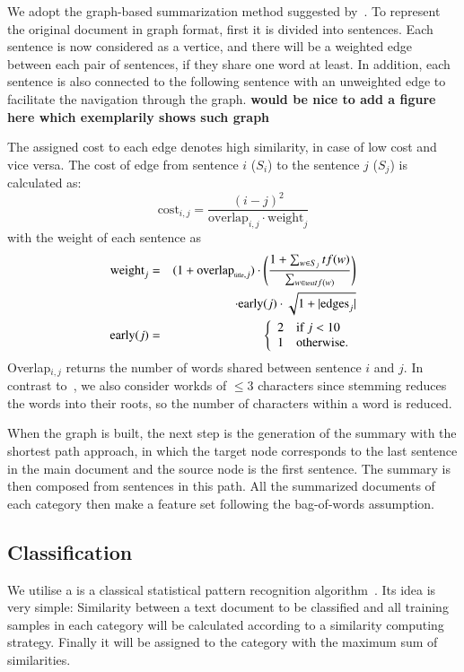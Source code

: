 \documentclass{sigchi}
\begin{document}
We adopt the graph-based summarization method suggested by~\cite{sjobergh2006extraction}. 
To represent the original document in graph format, first it is divided into sentences. 
Each sentence is now considered as a vertice, and there will be a weighted edge between each pair of sentences, if they share one word at least.
In addition, each sentence is also connected to the following sentence with an unweighted edge to facilitate the navigation through the graph.
\textbf{would be nice to add a figure here which exemplarily shows such graph}

The assigned cost to each edge denotes high similarity, in case of low cost and vice versa. 
The cost of edge from sentence $i$ ($S_i$) to the sentence $j$ ($S_j$) is calculated as:
\begin{equation}
 \mbox{cost}_{i,j}=\frac{(i-j)^2}{\mbox{overlap}_{i,j}\cdot\mbox{weight}_j}
\end{equation}
with the weight of each sentence as 
\begin{eqnarray}
 \mbox{weight}_j&=&(1+\mbox{overlap}_{\mbox{\tiny title},j})\cdot\left(\frac{1+\sum_{w\in S_j}tf(w)}{\sum_{w\in\mbox{\tiny text}tf(w)}}\right)\nonumber\\
 &&\cdot\mbox{early}(j)\cdot\sqrt{1+|\mbox{edges}_j|}\\
 \mbox{early}(j)&=&\left\{\begin{array}{ll}
                         2 & \mbox{if }j<10\\
                         1 & \mbox{otherwise.}
                        \end{array}
\right.
\end{eqnarray}
Overlap$_{i,j}$ returns the number of words shared between sentence $i$ and $j$. 
In contrast to~\cite{sjobergh2006extraction}, we also consider workds of $\leq3$ characters since stemming reduces the words into their roots, so the number of characters within a word is reduced.

When the graph is built, the next step is the generation of the summary with the shortest path approach, in which the target node corresponds to the last sentence in the main document and the source node is the first sentence. 
The summary is then composed from sentences in this path. 
All the summarized documents of each category then make a feature set following the bag-of-words assumption.

\subsection{Classification}\label{sectionClassification}
We utilise a is a classical statistical pattern recognition algorithm~\cite{5190062}. 
Its idea is very simple: Similarity between a text document to be classified and all training samples in each category will be calculated according to a similarity computing strategy.
Finally it will be assigned to the category with the maximum sum of similarities.
\end{document}

